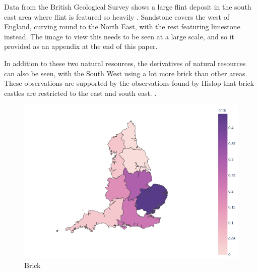 \documentclass[12pt]{article}
\begin{document}
\vspace{1cm}
Data from the British Geological Survey shows a large flint deposit in the south east area where flint is featured so heavily \cite{bgs}. Sandstone covers the west of England, curving round to the North East, with the rest featuring limestone instead. The image to view this needs to be seen at a large scale, and so it provided as an appendix at the end of this paper.

In addition to these two natural resources, the derivatives of natural resources can also be seen, with the South West using a lot more brick than other areas. These observations are supported by the observations found by Hislop that brick castles are restricted to the east and south east. \cite{HislopMalcolm2016Cb:a}.

\begin{minipage}{0.45\textwidth}
	\begin{figure}[H]
		\centering
		\includegraphics[width=\textwidth]{brick.png}
		\caption{Brick}
	\end{figure}
\end{minipage}
\end{document}
